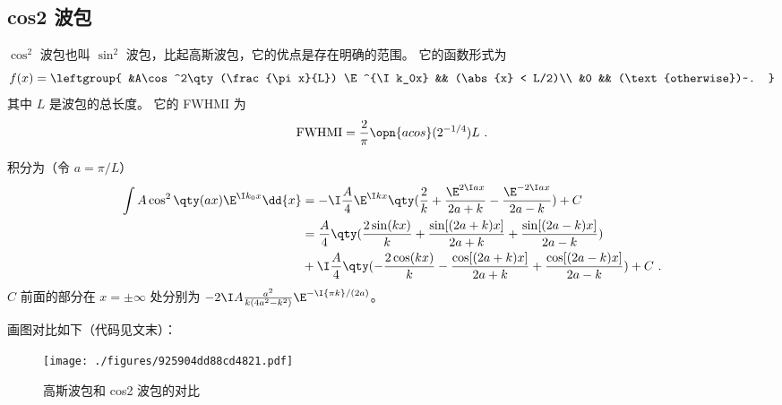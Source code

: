 \subsection{cos2 波包}
$\cos^2$ 波包也叫 $\sin^2$ 波包，比起高斯波包，它的优点是存在明确的范围。 它的函数形式为
\begin{equation}\label{eq_GausPk_5}
f(x) = \leftgroup{
&A\cos^2\qty(\frac{\pi x}{L}) \E^{\I k_0x} && (\abs{x} < L/2)\\
&0 && (\text{otherwise})~.
}\end{equation}
其中 $L$ 是波包的总长度。 它的 FWHMI 为
\begin{equation}\label{eq_GausPk_4}
\text{FWHMI} = \frac{2}{\pi}\opn{acos}(2^{-1/4}) L~.
\end{equation}

积分为（令 $a = \pi/L$）
\begin{equation}\label{eq_GausPk_2} %
\begin{aligned}
\int A\cos^2\qty(a x) \E^{\I k_0x} \dd{x} &= -\I\frac{A}{4}\E^{\I kx}\qty(\frac{2}{k} +\frac{\E^{2\I ax}}{2a+k} -\frac{\E^{-2\I ax}}{2a-k}) + C\\
&= \frac{A}{4} \qty(\frac{2\sin(k x)}{k} +\frac{\sin[(2 a+k)x]}{2 a+k} +\frac{\sin[(2 a-k)x]}{2 a-k})\\
&+\I\frac{A}{4} \qty(-\frac{2\cos(k x)}{k} -\frac{\cos[(2 a+k)x]}{2 a+k} +\frac{\cos[(2 a-k)x]}{2 a-k}) + C~.
\end{aligned}
\end{equation}
$C$ 前面的部分在 $x = \pm\infty$ 处分别为 $-2\I A\frac{a^2}{k(4 a^2 -k^2)}\E^{-\I{\pi k}/{(2a)}}$。

画图对比如下（代码见文末）：
\begin{figure}[ht]
\centering
\texttt{[image: ./figures/925904dd88cd4821.pdf]}
\caption{高斯波包和 cos2 波包的对比} \label{fig_GausPk_2}
\end{figure}

